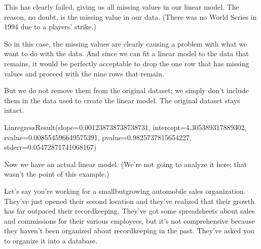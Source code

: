 \documentclass[letterpaper,10pt,english]{jupyterBook}
\begin{document}
\sphinxAtStartPar
This has clearly failed, giving us all missing values in our linear model.  The reason, no doubt, is the missing value in our data.  (There was no World Series in 1994 due to a players’ strike.)

\sphinxAtStartPar
So in this case, the missing values are clearly causing a problem with what we want to do with the data.  And since we can fit a linear model to the data that remains, it would be perfectly acceptable to drop the one row that has missing values and proceed with the nine rows that remain.  

\sphinxAtStartPar
But we do not remove them from the original dataset; we simply don’t include them in the data used to create the linear model.  The original dataset stays intact.

\begin{sphinxVerbatim}[commandchars=\\\{\}]
  
 \PYG{p}{[}\PYG{p}{]} \PYG{p}{[}\PYG{p}{]} 
\end{sphinxVerbatim}

\begin{sphinxVerbatim}[commandchars=\\\{\}]
LinregressResult(slope=\PYGZhy{}0.001238738738738731, intercept=4.305389317889302, rvalue=\PYGZhy{}0.008554596649575391, pvalue=0.9825737815654227, stderr=0.05472871741068167)
\end{sphinxVerbatim}

\sphinxAtStartPar
Now we have an actual linear model.  (We’re not going to analyze it here; that wasn’t the point of this example.)

\sphinxAtStartPar
{}

\sphinxAtStartPar
Let’s say you’re working for a small\sphinxhyphen{}but\sphinxhyphen{}growing automobile sales organization.  They’ve just opened their second location and they’ve realized that their growth has far outpaced their record\sphinxhyphen{}keeping.  They’ve got some spreadsheets about sales and commissions for their various employees, but it’s not comprehensive because they haven’t been organized about record\sphinxhyphen{}keeping in the past.  They’ve asked you to organize it into a database.
\end{document}
